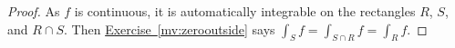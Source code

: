 \documentclass[12pt]{book}
\theoremstyle{plain}
\theoremstyle{remark}
\theoremstyle{definition}
\theoremstyle{exercise}
\theoremstyle{example}
\newcommand{\exerciseref}[1]{\hyperref[#1]{Exercise~\ref*{#1}}}
\begin{document}
\begin{proof}
As $f$ is continuous, it is automatically integrable on the rectangles $R$, $S$, and $R
\cap S$.
Then \exerciseref{mv:zerooutside} says
$\int_S f = \int_{S \cap R} f = \int_R f$.
%
\end{proof}
\end{document}
